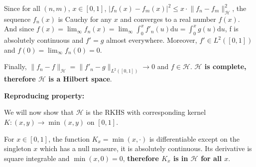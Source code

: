 \documentclass[10pt]{article}
\begin{document}
    Since for all $(n,m)$, $x \in [0, 1]$, 
    $|f_n(x) - f_m(x)|^2\leq x \cdot \lVert f_n - f_m \rVert_\mathcal{H}^2$, the
    sequence $f_n(x)$ is Cauchy for any $x$ and converges to a real number 
    $f(x)$. 
    And since $f(x) = \lim_\infty f_n(x) = \lim_\infty \int_0^xf'_n(u)\text{d}u
    =  \int_0^x g(u)\text{d}u$, f is absolutely continuous and $f' = g$ almost
    everywhere. Moreover, $f'\in L^2([0, 1])$ and $f(0) = \lim_\infty f_n(0) 
    = 0$. 
     
    Finally, $\lVert f_n - f \rVert_\mathcal{H} = \lVert f'_n - g 
    \rVert_{L^2([0,1])} \rightarrow 0$ and $f\in \mathcal{H}$.
    \textbf{$\mathcal{H}$ is complete, therefore $\mathcal{H}$ is a Hilbert
    space}.
    \vspace{1cm}

    \textbf{Reproducing property: }

    We will now show that $\mathcal{H}$ is the RKHS with corresponding kernel 
    $K: (x, y) \rightarrow \min(x, y)$ on $[0, 1]$.

    For $x\in [0, 1]$, the function $K_x = \min(x,\cdot)$ is differentiable 
    except on the singleton ${x}$ which has a null measure, it is absolutely 
    continuous. Its derivative is square integrable and $\min(x,0) = 0$, 
    \textbf{therefore $K_x$ is in $\mathcal{H}$ for all $x$}.
\end{document}
